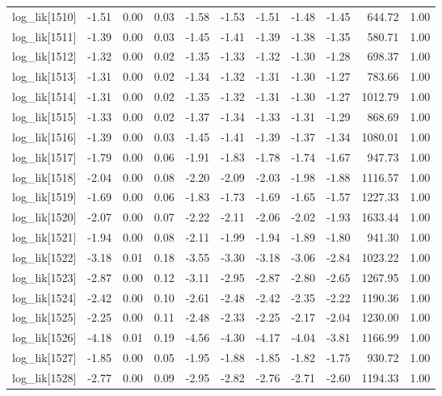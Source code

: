 \begin{table}[ht]
\begin{tabular}{rrrrrrrrrrr}
  log\_lik[1510] & -1.51 & 0.00 & 0.03 & -1.58 & -1.53 & -1.51 & -1.48 & -1.45 & 644.72 & 1.00 \\ 
  log\_lik[1511] & -1.39 & 0.00 & 0.03 & -1.45 & -1.41 & -1.39 & -1.38 & -1.35 & 580.71 & 1.00 \\ 
  log\_lik[1512] & -1.32 & 0.00 & 0.02 & -1.35 & -1.33 & -1.32 & -1.30 & -1.28 & 698.37 & 1.00 \\ 
  log\_lik[1513] & -1.31 & 0.00 & 0.02 & -1.34 & -1.32 & -1.31 & -1.30 & -1.27 & 783.66 & 1.00 \\ 
  log\_lik[1514] & -1.31 & 0.00 & 0.02 & -1.35 & -1.32 & -1.31 & -1.30 & -1.27 & 1012.79 & 1.00 \\ 
  log\_lik[1515] & -1.33 & 0.00 & 0.02 & -1.37 & -1.34 & -1.33 & -1.31 & -1.29 & 868.69 & 1.00 \\ 
  log\_lik[1516] & -1.39 & 0.00 & 0.03 & -1.45 & -1.41 & -1.39 & -1.37 & -1.34 & 1080.01 & 1.00 \\ 
  log\_lik[1517] & -1.79 & 0.00 & 0.06 & -1.91 & -1.83 & -1.78 & -1.74 & -1.67 & 947.73 & 1.00 \\ 
  log\_lik[1518] & -2.04 & 0.00 & 0.08 & -2.20 & -2.09 & -2.03 & -1.98 & -1.88 & 1116.57 & 1.00 \\ 
  log\_lik[1519] & -1.69 & 0.00 & 0.06 & -1.83 & -1.73 & -1.69 & -1.65 & -1.57 & 1227.33 & 1.00 \\ 
  log\_lik[1520] & -2.07 & 0.00 & 0.07 & -2.22 & -2.11 & -2.06 & -2.02 & -1.93 & 1633.44 & 1.00 \\ 
  log\_lik[1521] & -1.94 & 0.00 & 0.08 & -2.11 & -1.99 & -1.94 & -1.89 & -1.80 & 941.30 & 1.00 \\ 
  log\_lik[1522] & -3.18 & 0.01 & 0.18 & -3.55 & -3.30 & -3.18 & -3.06 & -2.84 & 1023.22 & 1.00 \\ 
  log\_lik[1523] & -2.87 & 0.00 & 0.12 & -3.11 & -2.95 & -2.87 & -2.80 & -2.65 & 1267.95 & 1.00 \\ 
  log\_lik[1524] & -2.42 & 0.00 & 0.10 & -2.61 & -2.48 & -2.42 & -2.35 & -2.22 & 1190.36 & 1.00 \\ 
  log\_lik[1525] & -2.25 & 0.00 & 0.11 & -2.48 & -2.33 & -2.25 & -2.17 & -2.04 & 1230.00 & 1.00 \\ 
  log\_lik[1526] & -4.18 & 0.01 & 0.19 & -4.56 & -4.30 & -4.17 & -4.04 & -3.81 & 1166.99 & 1.00 \\ 
  log\_lik[1527] & -1.85 & 0.00 & 0.05 & -1.95 & -1.88 & -1.85 & -1.82 & -1.75 & 930.72 & 1.00 \\ 
  log\_lik[1528] & -2.77 & 0.00 & 0.09 & -2.95 & -2.82 & -2.76 & -2.71 & -2.60 & 1194.33 & 1.00 \\ 

\end{tabular}
\end{table}
